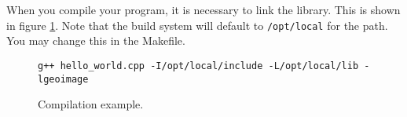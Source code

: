 \documentclass[10pt]{report}
\begin{document}
When you compile your program, it is necessary to link the library. This
is shown in figure \ref{fig:basic02}.  Note that the build system will 
default to \texttt{/opt/local} for the path.  You may change this in the Makefile.


\begin{figure}[!h]
\begin{verbatim}
g++ hello_world.cpp -I/opt/local/include -L/opt/local/lib -lgeoimage
\end{verbatim}
\caption{Compilation example.}
\label{fig:basic02}
\end{figure}
\end{document}

